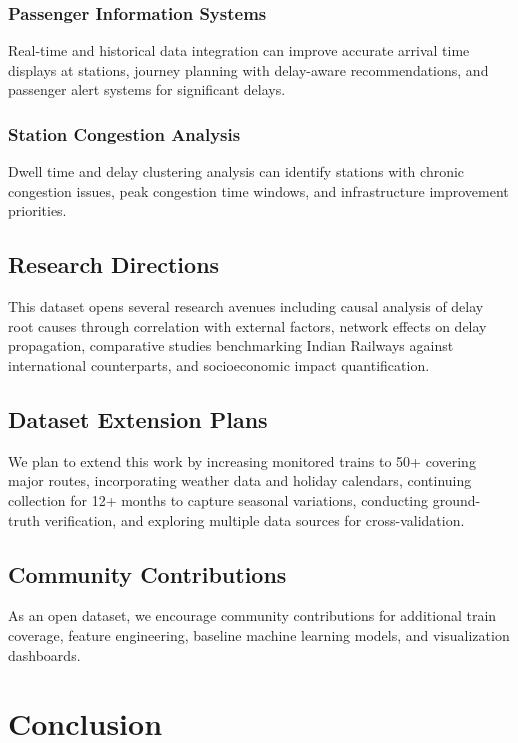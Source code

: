 \documentclass[conference]{IEEEtran}
\begin{document}
\subsubsection{Passenger Information Systems}
Real-time and historical data integration can improve accurate arrival time displays at stations, journey planning with delay-aware recommendations, and passenger alert systems for significant delays.

\subsubsection{Station Congestion Analysis}
Dwell time and delay clustering analysis can identify stations with chronic congestion issues, peak congestion time windows, and infrastructure improvement priorities.

\subsection{Research Directions}

This dataset opens several research avenues including causal analysis of delay root causes through correlation with external factors, network effects on delay propagation, comparative studies benchmarking Indian Railways against international counterparts, and socioeconomic impact quantification.

\subsection{Dataset Extension Plans}

We plan to extend this work by increasing monitored trains to 50+ covering major routes, incorporating weather data and holiday calendars, continuing collection for 12+ months to capture seasonal variations, conducting ground-truth verification, and exploring multiple data sources for cross-validation.

\subsection{Community Contributions}

As an open dataset, we encourage community contributions for additional train coverage, feature engineering, baseline machine learning models, and visualization dashboards.

\section{Conclusion}
\end{document}
